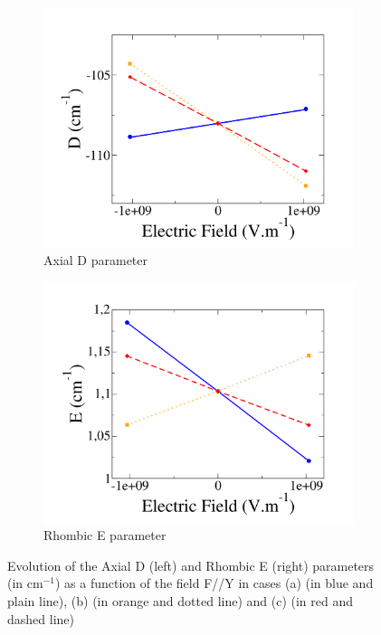 \documentclass[10pt]{report}
\numberwithin{equation}{section}
\begin{document}
\begin{figure}[!h]
    \centering
    \begin{subfigure}{.5\textwidth}
      \centering
      \includegraphics[width=\linewidth]{Images/D_E_Y.png}
      \caption{Axial D parameter}
      \label{fig:Ni_D_Y}
    \end{subfigure}%
    \begin{subfigure}{.5\textwidth}
      \centering
      \includegraphics[width=\linewidth]{Images/E_E_Y.png}
      \caption{Rhombic E parameter}
      \label{fig:Ni_E_Y}
    \end{subfigure}
    \caption{Evolution of the Axial D (left) and Rhombic E (right) parameters (in cm$^{-1}$) as a function of the field F//Y in cases (a) (in blue and plain line), (b)
    (in orange and dotted line) and (c) (in red and dashed line)}
    \label{fig:ParamNi_E_Y}
\end{figure}
\end{document}
